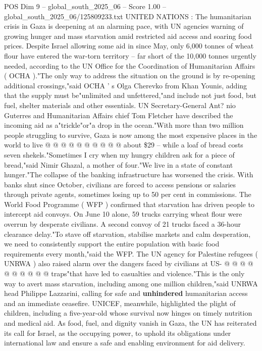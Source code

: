 \begin{textsample}{POS Dim 9 – global\_south\_2025\_06 – Score 1.00 – global\_south\_2025\_06/125809233.txt}  \label{ex:f9_pos_180}
UNITED NATIONS : The humanitarian crisis in Gaza is deepening at an alarming pace, with UN agencies warning of growing hunger and mass starvation amid restricted aid access and soaring food prices.
Despite Israel allowing some aid in since May, only 6,000 tonnes of wheat flour have entered the war-torn territory -- far short of the 10,000 tonnes urgently needed, according to the UN Office for the Coordination of Humanitarian Affairs ( OCHA )."The only way to address the situation on the ground is by re-opening additional crossings,"said OCHA ' s Olga Cherevko from Khan Younis, adding that the supply must be"unlimited and unfettered,"and include not just food, but fuel, shelter materials and other essentials.
UN Secretary-General Ant? nio Guterres and Humanitarian Affairs chief Tom Fletcher have described the incoming aid as a"trickle"or"a drop in the ocean."With more than two million people struggling to survive, Gaza is now among the most expensive places in the world to live @ @ @ @ @ @ @ @ @ @ about \$29 -- while a loaf of bread costs seven shekels."Sometimes I cry when my hungry children ask for a piece of bread,"said Nimir Ghazal, a mother of four."We live in a state of constant hunger."The collapse of the banking infrastructure has worsened the crisis.
With banks shut since October, civilians are forced to access pensions or salaries through private agents, sometimes losing up to 50 per cent in commissions.
The World Food Programme ( WFP ) confirmed that starvation has driven people to intercept aid convoys.
On June 10 alone, 59 trucks carrying wheat flour were overrun by desperate civilians.
A second convoy of 21 trucks faced a 36-hour clearance delay."To stave off starvation, stabilise markets and calm desperation, we need to consistently support the entire population with basic food requirements every month,"said the WFP.
The UN agency for Palestine refugees ( UNRWA ) also raised alarm over the dangers faced by civilians at US- @ @ @ @ @ @ @ @ @ @ traps"that have led to casualties and violence."This is the only way to avert mass starvation, including among one million children,"said UNRWA head Philippe Lazzarini, calling for safe and \textbf{unhindered} humanitarian access and an immediate ceasefire.
UNICEF, meanwhile, highlighted the plight of children, including a five-year-old whose survival now hinges on timely nutrition and medical aid.
As food, fuel, and dignity vanish in Gaza, the UN has reiterated its call for Israel, as the occupying power, to uphold its obligations under international law and ensure a safe and enabling environment for aid delivery.

\end{textsample}
